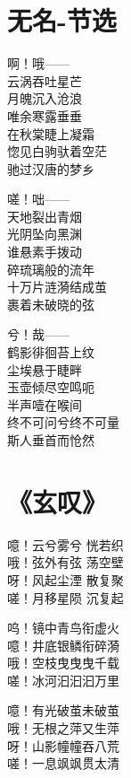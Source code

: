 \clearpage


\section{无名-节选}

啊！哦—— \\
云涡吞吐星芒 \\
月魄沉入沧浪 \\
唯余寒露垂垂 \\
在秋棠睫上凝霜 \\
惚见白驹驮着空茫 \\
驰过汉唐的梦乡
\vspace{1em}

嗟！咄—— \\
天地裂出青烟 \\
光阴坠向黑渊 \\
谁悬素手拨动 \\
碎琉璃般的流年 \\
十万片涟漪结成茧 \\
裹着未破晓的弦
\vspace{1em}

兮！哉—— \\
鹤影徘徊苔上纹 \\
尘埃悬于睫畔 \\
玉壶倾尽空鸣呃 \\
半声噎在喉间 \\
终不可问兮终不可量 \\
斯人垂首而怆然

\clearpage


\section{《玄叹》}

噫！云兮雾兮 恍若织 \\
哦！弦外有弦 荡空壁 \\
呀！风起尘湮 散复聚 \\
嗟！月移星陨 沉复起
\vspace{1em}

呜！镜中青鸟衔虚火 \\
噫！井底银鳞衔碎漪 \\
哦！空枝曳曳曳千载 \\
嗟！冰河汩汩汩万里
\vspace{1em}

噫！有光破茧未破茧 \\
哦！无根之萍又生萍 \\
呀！山影幢幢吞八荒 \\
嗟！一息飒飒贯太清

